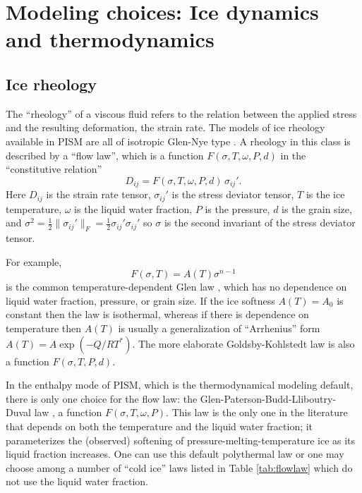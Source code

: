 
\section{Modeling choices:  Ice dynamics and thermodynamics}
\label{sec:modeling-dynamics}

\subsection{Ice rheology}
\label{sec:rheology}

The ``rheology'' of a viscous fluid refers to the relation between the applied stress and the resulting deformation, the strain rate.  The models of ice rheology available in PISM are all of isotropic Glen-Nye type \cite{Paterson}.   A rheology in this class is described by a ``flow law'', which is a function $F(\sigma,T,\omega,P,d)$ in the ``constitutive relation''
\begin{equation}
D_{ij} = F(\sigma,T,\omega,P,d)\, \sigma_{ij}'.  \label{eq:constitutive}
\end{equation}
Here $D_{ij}$ is the strain rate tensor, $\sigma_{ij}'$ is the stress deviator tensor, $T$ is the ice temperature, $\omega$ is the liquid water fraction, $P$ is the pressure, $d$ is the grain size, and $\sigma^2 = \frac{1}{2} \|\sigma_{ij}'\|_F = \frac{1}{2} \sigma_{ij}' \sigma_{ij}'$ so $\sigma$ is the second invariant of the stress deviator tensor.

For example,
\begin{equation}
F(\sigma,T) = A(T) \sigma^{n-1}  \label{eq:isothermalglen}
\end{equation}
is the common temperature-dependent Glen law \cite{PatersonBudd,BBL}, which has no dependence on liquid water fraction, pressure, or grain size.  If the ice softness $A(T)=A_0$ is constant then the law is isothermal, whereas if there is dependence on temperature then $A(T)$ is usually a generalization of ``Arrhenius'' form $A(T) = A \exp(-Q/RT^*)$.  The more elaborate Goldsby-Kohlstedt law \cite{GoldsbyKohlstedt} is also a function $F(\sigma,T,P,d)$.

In the enthalpy mode of PISM, which is the thermodynamical modeling default, there is only one choice for the flow law: the Glen-Paterson-Budd-Lliboutry-Duval law \cite{AschwandenBuelerKhroulevBlatter,LliboutryDuval1985,PatersonBudd}, a function $F(\sigma,T,\omega,P)$.  This law is the only one in the literature that depends on both the temperature and the liquid water fraction; it parameterizes the (observed) softening of pressure-melting-temperature ice as its liquid fraction increases.  One can use this default polythermal law or one may choose among a number of ``cold ice'' laws listed in Table \ref{tab:flowlaw} which do not use the liquid water fraction.  

